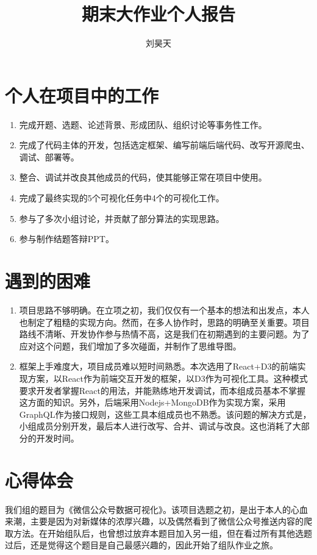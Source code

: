 \documentclass[a4paper,12pt]{article}
\title{期末大作业个人报告}
\author{刘昊天}
\begin{document}
    \maketitle
    \section{个人在项目中的工作}
      \begin{enumerate}
        \item 完成开题、选题、论述背景、形成团队、组织讨论等事务性工作。
        \item 完成了代码主体的开发，包括选定框架、编写前端后端代码、改写开源爬虫、调试、部署等。
        \item 整合、调试并改良其他成员的代码，使其能够正常在项目中使用。
        \item 完成了最终实现的5个可视化任务中4个的可视化工作。
        \item 参与了多次小组讨论，并贡献了部分算法的实现思路。
        \item 参与制作结题答辩PPT。
      \end{enumerate}
    \section{遇到的困难}
    \begin{enumerate}
      \item 项目思路不够明确。在立项之初，我们仅仅有一个基本的想法和出发点，本人也制定了粗糙的实现方向。然而，在多人协作时，思路的明确至关重要。项目路线不清晰、开发协作参与热情不高，这是我们在初期遇到的主要问题。为了应对这个问题，我们增加了多次碰面，并制作了思维导图。
      \item 框架上手难度大，项目成员难以短时间熟悉。本次选用了React+D3的前端实现方案，以React作为前端交互开发的框架，以D3作为可视化工具。这种模式要求开发者掌握React的用法，并能熟练地开发调试，而本组成员基本不掌握这方面的知识。另外，后端采用Nodejs+MongoDB作为实现方案，采用GraphQL作为接口规则，这些工具本组成员也不熟悉。该问题的解决方式是，小组成员分别开发，最后本人进行改写、合并、调试与改良。这也消耗了大部分的开发时间。
    \end{enumerate}
    \section{心得体会}
    我们组的题目为《微信公众号数据可视化》。该项目选题之初，是出于本人的心血来潮，主要是因为对新媒体的浓厚兴趣，以及偶然看到了微信公众号推送内容的爬取方法。在开始组队后，也曾想过放弃本题目加入另一组，但在看过所有其他选题过后，还是觉得这个题目是自己最感兴趣的，因此开始了组队作业之旅。
\end{document}
